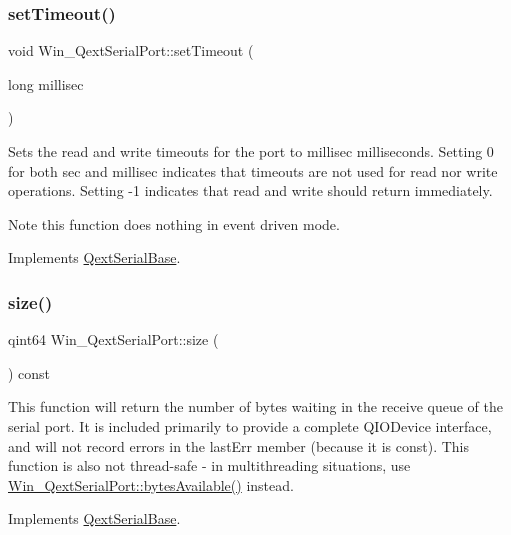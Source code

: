 \subsubsection{\texorpdfstring{set\+Timeout()}{setTimeout()}}
{\footnotesize\ttfamily void Win\+\_\+\+Qext\+Serial\+Port\+::set\+Timeout (\begin{DoxyParamCaption}\item[{long}]{millisec }\end{DoxyParamCaption})\hspace{0.3cm}{\ttfamily [virtual]}}

Sets the read and write timeouts for the port to millisec milliseconds. Setting 0 for both sec and millisec indicates that timeouts are not used for read nor write operations. Setting -\/1 indicates that read and write should return immediately.

\begin{DoxyNote}{Note}
this function does nothing in event driven mode. 
\end{DoxyNote}


Implements \mbox{\hyperlink{class_qext_serial_base}{Qext\+Serial\+Base}}.

\mbox{\label{class_win___qext_serial_port_a96d6dc07286366b2b553b6f6244e406e}} 
\subsubsection{\texorpdfstring{size()}{size()}}
{\footnotesize\ttfamily qint64 Win\+\_\+\+Qext\+Serial\+Port\+::size (\begin{DoxyParamCaption}{ }\end{DoxyParamCaption}) const\hspace{0.3cm}{\ttfamily [virtual]}}

This function will return the number of bytes waiting in the receive queue of the serial port. It is included primarily to provide a complete Q\+I\+O\+Device interface, and will not record errors in the last\+Err member (because it is const). This function is also not thread-\/safe -\/ in multithreading situations, use \mbox{\hyperlink{class_win___qext_serial_port_a8c76fa901fd01f97f57addad088c3e2c}{Win\+\_\+\+Qext\+Serial\+Port\+::bytes\+Available()}} instead. 

Implements \mbox{\hyperlink{class_qext_serial_base}{Qext\+Serial\+Base}}.


